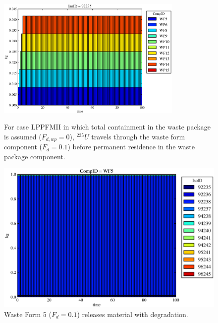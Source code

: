 \begin{figure}[ht]
\centering
\includegraphics[width=0.8\textwidth]{./chapters/demonstration/base/lpPFMII.eps}
\caption[$^{235}U$ residence. Lumped Parameter PFM Waste Package No Release.]{
For case LPPFMII in which total containment in the waste package is assumed 
($F_{d,wp}=0$), $^{235}U$ travels through the waste form component ($F_d = 0.1$) before 
permanent residence in the waste package component.
}
\label{fig:lpPFMIIall}
\begin{minipage}[b]{0.45\linewidth}

  \includegraphics[width=\textwidth]{./chapters/demonstration/base/lpPFMII1.eps}
  \caption[LPPFMII Waste Form Contaminants.]{
    Waste Form 5 ($F_d = 0.1$) releases material with degradation. 
    }
  \label{fig:lpPFMIIwf5}
  

\end{minipage}
\end{figure}
